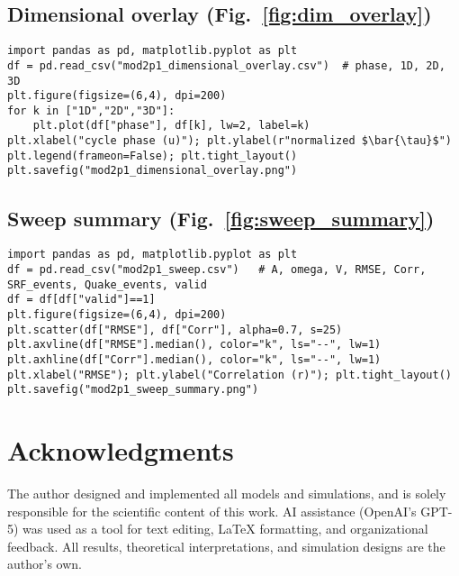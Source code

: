 \documentclass[12pt]{article}
\begin{document}
\subsection{Dimensional overlay (Fig.~\ref{fig:dim_overlay})}
\begin{lstlisting}
import pandas as pd, matplotlib.pyplot as plt
df = pd.read_csv("mod2p1_dimensional_overlay.csv")  # phase, 1D, 2D, 3D
plt.figure(figsize=(6,4), dpi=200)
for k in ["1D","2D","3D"]:
    plt.plot(df["phase"], df[k], lw=2, label=k)
plt.xlabel("cycle phase (u)"); plt.ylabel(r"normalized $\bar{\tau}$")
plt.legend(frameon=False); plt.tight_layout()
plt.savefig("mod2p1_dimensional_overlay.png")
\end{lstlisting}

\subsection{Sweep summary (Fig.~\ref{fig:sweep_summary})}
\begin{lstlisting}
import pandas as pd, matplotlib.pyplot as plt
df = pd.read_csv("mod2p1_sweep.csv")   # A, omega, V, RMSE, Corr, SRF_events, Quake_events, valid
df = df[df["valid"]==1]
plt.figure(figsize=(6,4), dpi=200)
plt.scatter(df["RMSE"], df["Corr"], alpha=0.7, s=25)
plt.axvline(df["RMSE"].median(), color="k", ls="--", lw=1)
plt.axhline(df["Corr"].median(), color="k", ls="--", lw=1)
plt.xlabel("RMSE"); plt.ylabel("Correlation (r)"); plt.tight_layout()
plt.savefig("mod2p1_sweep_summary.png")
\end{lstlisting}
\section*{Acknowledgments}

The author designed and implemented all models and simulations, and is solely
responsible for the scientific content of this work. AI assistance (OpenAI’s GPT-5)
was used as a tool for text editing, LaTeX formatting, and organizational feedback.
All results, theoretical interpretations, and simulation designs are the author’s own.
\end{document}
